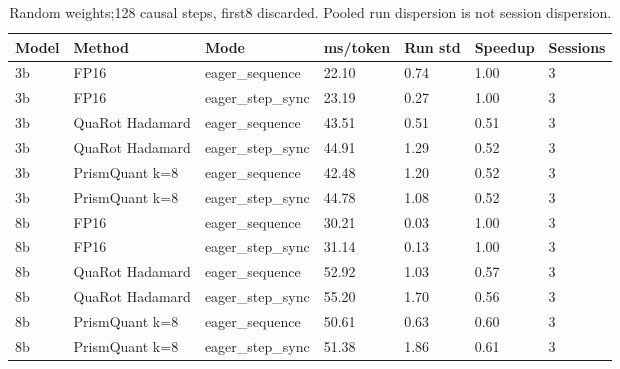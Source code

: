 \begin{table}[t]
\centering
\small
\caption{Random weights;128 causal steps, first8 discarded. Pooled run dispersion is not session dispersion.}
\begin{tabular}{lllllll}
\toprule
Model & Method & Mode & ms/token & Run std & Speedup & Sessions \\
\midrule
3b & FP16 & eager\_sequence & 22.10 & 0.74 & 1.00 & 3 \\
3b & FP16 & eager\_step\_sync & 23.19 & 0.27 & 1.00 & 3 \\
3b & QuaRot Hadamard & eager\_sequence & 43.51 & 0.51 & 0.51 & 3 \\
3b & QuaRot Hadamard & eager\_step\_sync & 44.91 & 1.29 & 0.52 & 3 \\
3b & PrismQuant k=8 & eager\_sequence & 42.48 & 1.20 & 0.52 & 3 \\
3b & PrismQuant k=8 & eager\_step\_sync & 44.78 & 1.08 & 0.52 & 3 \\
8b & FP16 & eager\_sequence & 30.21 & 0.03 & 1.00 & 3 \\
8b & FP16 & eager\_step\_sync & 31.14 & 0.13 & 1.00 & 3 \\
8b & QuaRot Hadamard & eager\_sequence & 52.92 & 1.03 & 0.57 & 3 \\
8b & QuaRot Hadamard & eager\_step\_sync & 55.20 & 1.70 & 0.56 & 3 \\
8b & PrismQuant k=8 & eager\_sequence & 50.61 & 0.63 & 0.60 & 3 \\
8b & PrismQuant k=8 & eager\_step\_sync & 51.38 & 1.86 & 0.61 & 3 \\
\bottomrule
\end{tabular}
\end{table}
